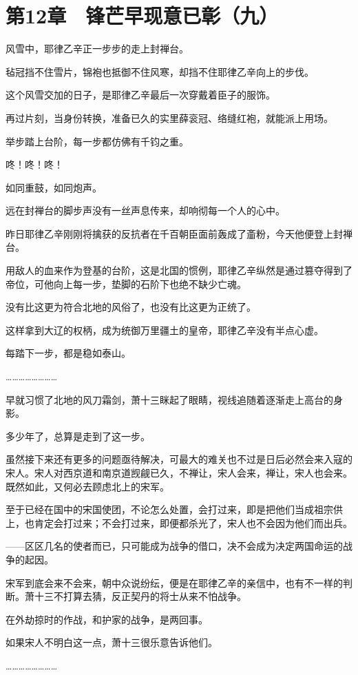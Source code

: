 \section{第12章　锋芒早现意已彰（九）}

风雪中，耶律乙辛正一步步的走上封禅台。

毡冠挡不住雪片，锦袍也抵御不住风寒，却挡不住耶律乙辛向上的步伐。

这个风雪交加的日子，是耶律乙辛最后一次穿戴着臣子的服饰。

再过片刻，当身份转换，准备已久的实里薛衮冠、络缝红袍，就能派上用场。

举步踏上台阶，每一步都仿佛有千钧之重。

咚！咚！咚！

如同重鼓，如同炮声。

远在封禅台的脚步声没有一丝声息传来，却响彻每一个人的心中。

昨日耶律乙辛刚刚将擒获的反抗者在千百朝臣面前轰成了齑粉，今天他便登上封禅台。

用敌人的血来作为登基的台阶，这是北国的惯例，耶律乙辛纵然是通过篡夺得到了帝位，可他向上每一步，垫脚的石阶下也绝不缺少亡魂。

没有比这更为符合北地的风俗了，也没有比这更为正统了。

这样拿到大辽的权柄，成为统御万里疆土的皇帝，耶律乙辛没有半点心虚。

每踏下一步，都是稳如泰山。

……………………

早就习惯了北地的风刀霜剑，萧十三眯起了眼睛，视线追随着逐渐走上高台的身影。

多少年了，总算是走到了这一步。

虽然接下来还有更多的问题亟待解决，可最大的难关也不过是日后必然会来入寇的宋人。宋人对西京道和南京道觊觎已久，不禅让，宋人会来，禅让，宋人也会来。既然如此，又何必去顾虑北上的宋军。

至于已经在国中的宋国使团，不论怎么处置，会打过来，即是把他们当成祖宗供上，也肯定会打过来；不会打过来，即便都杀光了，宋人也不会因为他们而出兵。

——区区几名的使者而已，只可能成为战争的借口，决不会成为决定两国命运的战争的起因。

宋军到底会来不会来，朝中众说纷纭，便是在耶律乙辛的亲信中，也有不一样的判断。萧十三不打算去猜，反正契丹的将士从来不怕战争。

在外劫掠时的作战，和护家的战争，是两回事。

如果宋人不明白这一点，萧十三很乐意告诉他们。

……………………

